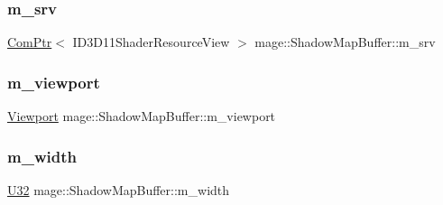 \hypertarget{structmage_1_1_shadow_map_buffer_af313b37ddc41f91e949d015086f6ba18}{}\label{structmage_1_1_shadow_map_buffer_af313b37ddc41f91e949d015086f6ba18} 
\subsubsection{\texorpdfstring{m\+\_\+srv}{m\_srv}}
{\footnotesize\ttfamily \hyperlink{namespacemage_ae74f374780900893caa5555d1031fd79}{Com\+Ptr}$<$ I\+D3\+D11\+Shader\+Resource\+View $>$ mage\+::\+Shadow\+Map\+Buffer\+::m\+\_\+srv\hspace{0.3cm}{\ttfamily [private]}}

\hypertarget{structmage_1_1_shadow_map_buffer_a5dd4126af774f674f69280f53dd8393d}{}\label{structmage_1_1_shadow_map_buffer_a5dd4126af774f674f69280f53dd8393d} 
\subsubsection{\texorpdfstring{m\+\_\+viewport}{m\_viewport}}
{\footnotesize\ttfamily \hyperlink{classmage_1_1_viewport}{Viewport} mage\+::\+Shadow\+Map\+Buffer\+::m\+\_\+viewport\hspace{0.3cm}{\ttfamily [private]}}

\hypertarget{structmage_1_1_shadow_map_buffer_ac8c9e5e52c31c9d358e4bb0f306439a6}{}\label{structmage_1_1_shadow_map_buffer_ac8c9e5e52c31c9d358e4bb0f306439a6} 
\subsubsection{\texorpdfstring{m\+\_\+width}{m\_width}}
{\footnotesize\ttfamily \hyperlink{namespacemage_a41c104c036fba3756a74e19f793eeaa1}{U32} mage\+::\+Shadow\+Map\+Buffer\+::m\+\_\+width\hspace{0.3cm}{\ttfamily [private]}}

